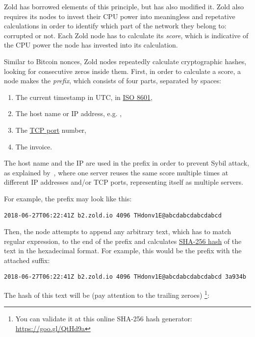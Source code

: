 \documentclass{main}
\begin{document}
Zold has borrowed elements of this principle, but has also modified it. Zold also requires
its nodes to invest their CPU power into meaningless and repetative
calculations in order to identify which part of the network they belong to:
corrupted or not. Each Zold node has to calculate its \emph{score},
which is indicative of the CPU power the node has invested into its calculation.

Similar to Bitcoin nonces, Zold nodes repeatedly calculate cryptographic hashes,
looking for consecutive zeros inside them. First, in order to calculate a score,
a node makes the \emph{prefix}, which consists of four parts,
separated by spaces:

\begin{enumerate}
\item The current timestamp in UTC, in \href{https://en.wikipedia.org/wiki/ISO_8601}{ISO 8601},
\item The host name or IP address, e.g. ,
\item The \href{https://en.wikipedia.org/wiki/Port_(computer_networking)}{TCP port} number,
\item The invoice.
\end{enumerate}

The host name and the IP are used in the prefix in order to prevent Sybil attack,
as explained by~\textcite{douceur2002},
where one server reuses the same score multiple times at different IP addresses
and/or TCP ports, representing itself as multiple servers.

For example, the prefix may look like this:

\begin{verbatim}
2018-06-27T06:22:41Z b2.zold.io 4096 THdonv1E@abcdabcdabcdabcd
\end{verbatim}

Then, the node attempts to append any arbitrary text, which has to match
\dd{/[a-zA-Z0-9]+/} regular expression, to the end of the prefix and calculates
\href{https://en.wikipedia.org/wiki/SHA-2}{SHA-256 hash}
of the text in the hexadecimal format. For example, this would be the prefix
with the attached  suffix:

\begin{verbatim}
2018-06-27T06:22:41Z b2.zold.io 4096 THdonv1E@abcdabcdabcdabcd 3a934b
\end{verbatim}

The hash of this text will be (pay attention to the trailing zeroes)%
\footnote{You can validate it at this online SHA-256 hash generator:
\url{https://goo.gl/QtHd9a}}:
\end{document}
